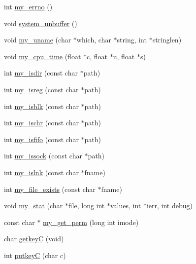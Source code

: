 \begin{DoxyCompactItemize}
\item 
int \mbox{\hyperlink{C-M__system_8c_ad9bbaffdef223d18bb59a22c3c599201}{my\+\_\+errno}} ()
\item 
void \mbox{\hyperlink{C-M__system_8c_ab955d6c562df08b9e465fe3cea24d83d}{system\+\_\+unbuffer}} ()
\item 
void \mbox{\hyperlink{C-M__system_8c_ab341d42a9117c4bd188dcdcbff69fe9a}{my\+\_\+uname}} (char $\ast$which, char $\ast$string, int $\ast$stringlen)
\item 
void \mbox{\hyperlink{C-M__system_8c_aae18c27a21f7c4aed7328460a7edb34c}{my\+\_\+cpu\+\_\+time}} (float $\ast$c, float $\ast$u, float $\ast$s)
\item 
int \mbox{\hyperlink{C-M__system_8c_a4d9118bb9590e12ac1956789cd08e09b}{my\+\_\+isdir}} (const char $\ast$path)
\item 
int \mbox{\hyperlink{C-M__system_8c_afec6872f4aa34aba9e71a18324d53bce}{my\+\_\+isreg}} (const char $\ast$path)
\item 
int \mbox{\hyperlink{C-M__system_8c_ad07b549d969a0670b0b8f7c6bef83e92}{my\+\_\+isblk}} (const char $\ast$path)
\item 
int \mbox{\hyperlink{C-M__system_8c_ae59ec13b3517e84ddd30a0cd5352a01d}{my\+\_\+ischr}} (const char $\ast$path)
\item 
int \mbox{\hyperlink{C-M__system_8c_ac4f0c51cc048efce7cc88a80c6ce50a4}{my\+\_\+isfifo}} (const char $\ast$path)
\item 
int \mbox{\hyperlink{C-M__system_8c_a090bd041de7e5661c0cb3dea61517283}{my\+\_\+issock}} (const char $\ast$path)
\item 
int \mbox{\hyperlink{C-M__system_8c_a5d15b99bbdd2c6d3e07c92b4bdebb732}{my\+\_\+islnk}} (const char $\ast$fname)
\item 
int \mbox{\hyperlink{C-M__system_8c_afc05a3ec2be734d741c384e752f96b90}{my\+\_\+file\+\_\+exists}} (const char $\ast$fname)
\item 
void \mbox{\hyperlink{C-M__system_8c_a93aa717690d60568cf019988f6434ba5}{my\+\_\+stat}} (char $\ast$file, long int $\ast$values, int $\ast$ierr, int debug)
\item 
const char $\ast$ \mbox{\hyperlink{C-M__system_8c_a1ef2ab1c7375f6b130cee762e770a29a}{my\+\_\+get\+\_\+perm}} (long int imode)
\item 
char \mbox{\hyperlink{C-M__system_8c_a00682f21b3d8ff5bbe69bf47e00f60ab}{getkeyC}} (void)
\item 
int \mbox{\hyperlink{C-M__system_8c_a834a89f46bdca2fc961db64cf3112cdf}{putkeyC}} (char c)
\end{DoxyCompactItemize}
